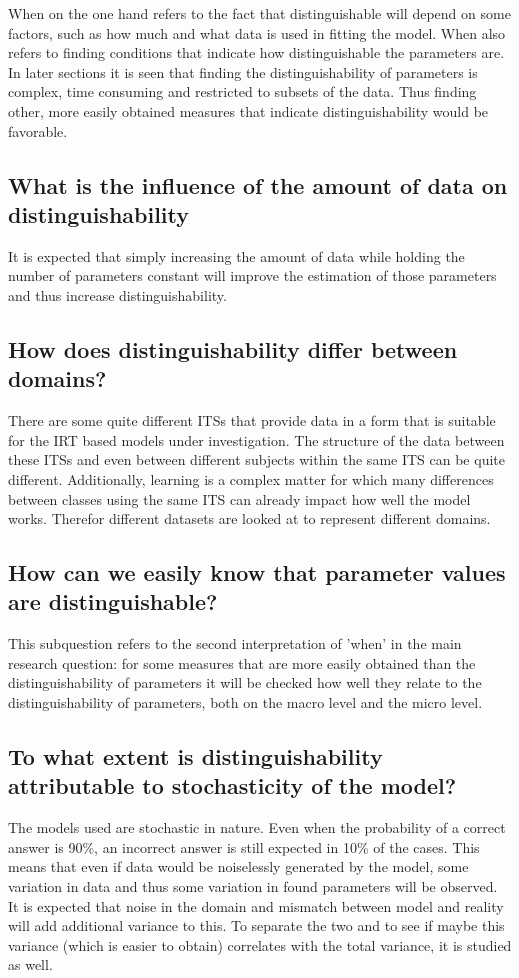 \documentclass{scrartcl}
\begin{document}
When on the one hand refers to the fact that distinguishable will depend on some factors, such as how much and what data is used in fitting the model. When also refers to finding conditions that indicate how distinguishable the parameters are. In later sections it is seen that finding the distinguishability of parameters is complex, time consuming and restricted to subsets of the data. Thus finding other, more easily obtained measures that indicate distinguishability would be favorable.

\subsection{What is the influence of the amount of data on distinguishability}
It is expected that simply increasing the amount of data while holding the number of parameters constant will improve the estimation of those parameters and thus increase distinguishability. 

\subsection{How does distinguishability differ between domains?}
There are some quite different ITSs that provide data in a form that is suitable for the IRT based models under investigation. The structure of the data between these ITSs and even between different subjects within the same ITS can be quite different. Additionally, learning is a complex matter for which many differences between classes using the same ITS can already impact how well the model works. Therefor different datasets are looked at to represent different domains.

\subsection{How can we easily know that parameter values are distinguishable?}
This subquestion refers to the second interpretation of 'when' in the main research question: for some measures that are more easily obtained than the distinguishability of parameters it will be checked how well they relate to the distinguishability of parameters, both on the macro level and the micro level.

\subsection{To what extent is distinguishability attributable to stochasticity of the model?}
The models used are stochastic in nature. Even when the probability of a correct answer is 90\%, an incorrect answer is still expected in 10\% of the cases. This means that even if data would be noiselessly generated by the model, some variation in data and thus some variation in found parameters will be observed. It is expected that noise in the domain and mismatch between model and reality will add additional variance to this. To separate the two and to see if maybe this variance (which is easier to obtain) correlates with the total variance, it is studied as well.
\end{document}
